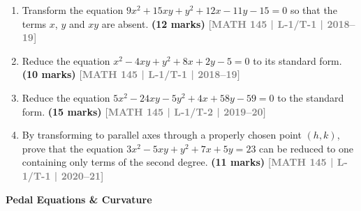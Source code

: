 \documentclass[12pt,a4paper]{article}
\newcommand{\yr}[1]{\hfill\textcolor{gray}{\small\textbf{[#1]}}}
\newcommand{\mk}[1]{\textcolor{orange!70!black}{\small\textbf{(#1 marks)}}}
\newcommand{\subtopic}[2]{%
  \vspace{10pt}
  \noindent\begin{tcolorbox}[colback=#1!8,colframe=#1,boxrule=0.6pt,arc=4pt,
    left=6pt,right=6pt,top=4pt,bottom=4pt]
    \small\bfseries\textcolor{#1}{#2}
  \end{tcolorbox}
  \vspace{2pt}
}
\begin{document}
\begin{enumerate}
\item Transform the equation $9x^{2}+15xy+y^{2}+12x-11y-15=0$ so that the terms $x$, $y$ and $xy$ are absent.
\mk{12} \yr{MATH 145 | L-1/T-1 | 2018--19}

\item Reduce the equation $x^{2}-4xy+y^{2}+8x+2y-5=0$ to its standard form.
\mk{10} \yr{MATH 145 | L-1/T-1 | 2018--19}

\item Reduce the equation $5x^{2}-24xy-5y^{2}+4x+58y-59=0$ to the standard form.
\mk{15} \yr{MATH 145 | L-1/T-2 | 2019--20}

\item By transforming to parallel axes through a properly chosen point $(h,k)$, prove that the equation $3x^{2}-5xy+y^{2}+7x+5y=23$ can be reduced to one containing only terms of the second degree.
\mk{11} \yr{MATH 145 | L-1/T-1 | 2020--21}



\end{enumerate}

\subtopic{cH}{Pedal Equations \& Curvature}
\label{sub:s10-pedal}
\end{document}
